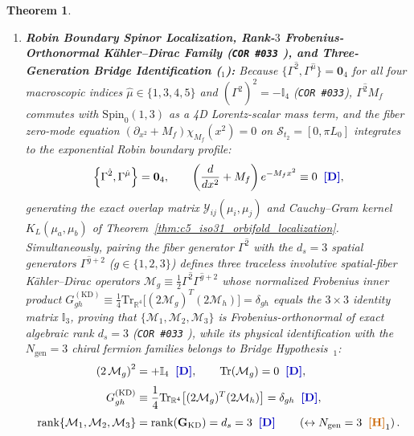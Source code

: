\documentclass[11pt,a4paper]{article}
\newcommand{\catD}{\text{\textbf{\textcolor{blue!75!black}{[D]}}}}
\newcommand{\catH}{\text{\textbf{\textcolor{orange!80!black}{[H]}}}}
\theoremstyle{definition}
\theoremstyle{plain}
\newtheorem{theorem}[axiom]{Theorem}
\theoremstyle{remark}
\begin{document}
\begin{theorem}
\begin{enumerate}[label=(\roman*)]
  \item \textbf{Robin Boundary Spinor Localization, Rank-$3$ Frobenius-Orthonormal K\"ahler--Dirac Family (\texttt{COR~\#033} \catD), and Three-Generation Bridge Identification (\catH$_1$):}
  Because $\{\Gamma^{\hat{2}}, \Gamma^{\hat{\mu}}\} = \mathbf{0}_4$ for all four macroscopic indices $\hat{\mu} \in \{1, 3, 4, 5\}$ and $(\Gamma^{\hat{2}})^2 = -\mathbb{I}_4$ (\texttt{COR~\#033}), $\Gamma^{\hat{2}}M_f$ commutes with $\mathrm{Spin}_0(1,3)$ as a 4D Lorentz-scalar mass term, and the fiber zero-mode equation $(\partial_{x^2} + M_f)\chi_{M_f}(x^2) = 0$ on $\mathcal{S}_{t_2} = [0, \pi L_0]$ integrates to the exponential Robin boundary profile:
  \begin{equation}\label{eq:c6_robin_localization_ode}
  \left\{\Gamma^{\hat{2}}, \Gamma^{\hat{\mu}}\right\} = \mathbf{0}_4, \qquad
  \left(\frac{d}{dx^2} + M_f\right)e^{-M_f x^2} \equiv 0 \;\;\catD,
  \end{equation}
  generating the exact overlap matrix $\mathcal{Y}_{ij}(\mu_i, \mu_j)$ and Cauchy--Gram kernel $K_L(\mu_a, \mu_b)$ of Theorem~\ref{thm:c5_iso31_orbifold_localization}. Simultaneously, pairing the fiber generator $\Gamma^{\hat{2}}$ with the $d_s = 3$ spatial generators $\Gamma^{\hat{g}+2}$ ($g \in \{1, 2, 3\}$) defines three traceless involutive spatial-fiber K\"ahler--Dirac operators $\mathcal{M}_g \equiv \frac{1}{2}\Gamma^{\hat{2}}\Gamma^{\hat{g}+2}$ whose normalized Frobenius inner product $G_{gh}^{(\mathrm{KD})} \equiv \frac{1}{4}\mathrm{Tr}_{\mathbb{R}^4}\!\big[(2\mathcal{M}_g)^T(2\mathcal{M}_h)\big] = \delta_{gh}$ equals the $3\times 3$ identity matrix $\mathbb{I}_3$, proving that $\{\mathcal{M}_1, \mathcal{M}_2, \mathcal{M}_3\}$ is Frobenius-orthonormal of exact algebraic rank $d_s = 3$ (\texttt{COR~\#033} \catD), while its physical identification with the $N_{\mathrm{gen}} = 3$ chiral fermion families belongs to Bridge Hypothesis~\catH$_1$:
  \begin{align}
  \left(2\,\mathcal{M}_g\right)^2 &= +\mathbb{I}_4 \;\;\catD, \qquad
  \mathrm{Tr}\!\left(\mathcal{M}_g\right) = 0 \;\;\catD, \nonumber \\[3pt]
  G_{gh}^{(\mathrm{KD})} &\equiv \frac{1}{4}\mathrm{Tr}_{\mathbb{R}^4}\!\left[(2\mathcal{M}_g)^T(2\mathcal{M}_h)\right] = \delta_{gh} \;\;\catD, \nonumber \\[3pt]
  \mathrm{rank}\!\left\{\mathcal{M}_1, \mathcal{M}_2, \mathcal{M}_3\right\} &= \mathrm{rank}\!\left(\mathbf{G}_{\mathrm{KD}}\right) = d_s = 3 \;\;\catD
  \qquad \left(\leftrightarrow N_{\mathrm{gen}} = 3 \;\;\catH_1\right). \label{eq:c6_kahler_dirac_ngen3}
  \end{align}
\end{enumerate}
\end{theorem}
\end{document}
